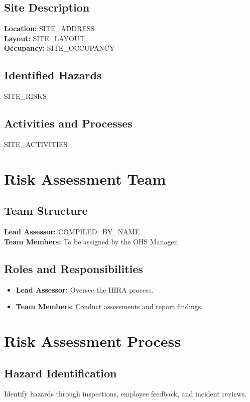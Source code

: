 \documentclass[12pt]{article}
\begin{document}
\subsection{Site Description}
\textbf{Location:} {{SITE_ADDRESS}}\\
\textbf{Layout:} {{SITE_LAYOUT}}\\
\textbf{Occupancy:} {{SITE_OCCUPANCY}}

\subsection{Identified Hazards}
{{SITE_RISKS}}

\subsection{Activities and Processes}
{{SITE_ACTIVITIES}}

\section{Risk Assessment Team}

\subsection{Team Structure}
\textbf{Lead Assessor:} {{COMPILED_BY_NAME}}\\
\textbf{Team Members:} To be assigned by the OHS Manager.

\subsection{Roles and Responsibilities}
\begin{itemize}
    \item \textbf{Lead Assessor:} Oversee the HIRA process.
    \item \textbf{Team Members:} Conduct assessments and report findings.
\end{itemize}

\section{Risk Assessment Process}

\subsection{Hazard Identification}
Identify hazards through inspections, employee feedback, and incident reviews.
\end{document}
